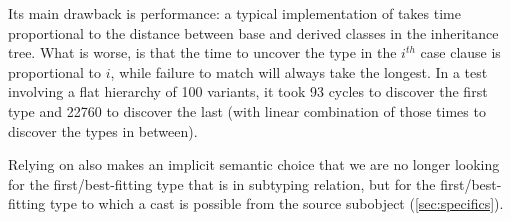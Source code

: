 \noindent
Its main drawback is performance: a typical 
implementation of  takes time proportional to the 
distance between base and derived classes in the inheritance tree.
What is worse, is that the time to uncover the type in the $i^{th}$ case clause 
is proportional to $i$, while failure to match will always take the longest. 
In a test involving a flat hierarchy of 100 variants, it took 93 cycles to 
discover the first type and 22760 to discover the last (with linear combination 
of those times to discover the types in between). %

Relying on  also makes an implicit semantic choice that we 
are no longer looking for the first/best-fitting type that is in subtyping 
relation, but for the first/best-fitting type to which a cast is possible from 
the source subobject (\textsection\ref{sec:specifics}).



